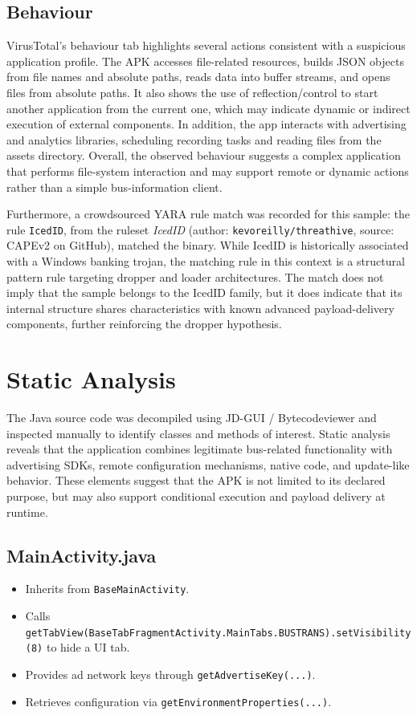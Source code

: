         \subsection{Behaviour}
        VirusTotal's behaviour tab highlights several actions consistent with a suspicious application profile. The APK accesses file-related resources, builds JSON objects from file names and absolute paths, reads data into buffer streams, and opens files from absolute paths. It also shows the use of reflection/control to start another application from the current one, which may indicate dynamic or indirect execution of external components. In addition, the app interacts with advertising and analytics libraries, scheduling recording tasks and reading files from the assets directory. Overall, the observed behaviour suggests a complex application that performs file-system interaction and may support remote or dynamic actions rather than a simple bus-information client.

        Furthermore, a crowdsourced YARA rule match was recorded for this sample: the rule \texttt{IcedID}, from the ruleset \textit{IcedID} (author: \texttt{kevoreilly/threathive}, source: CAPEv2 on GitHub), matched the binary. While IcedID is historically associated with a Windows banking trojan, the matching rule in this context is a structural pattern rule targeting dropper and loader architectures. The match does not imply that the sample belongs to the IcedID family, but it does indicate that its internal structure shares characteristics with known advanced payload-delivery components, further reinforcing the dropper hypothesis.

    \section{Static Analysis}
    The Java source code was decompiled using JD-GUI / Bytecodeviewer and inspected manually to identify classes and methods of interest.
    Static analysis reveals that the application combines legitimate bus-related functionality with advertising SDKs, remote configuration mechanisms, native code, and update-like behavior. These elements suggest that the APK is not limited to its declared purpose, but may also support conditional execution and payload delivery at runtime.

    \subsection{MainActivity.java}
\begin{itemize}
    \item Inherits from \texttt{BaseMainActivity}.
    \item Calls \texttt{getTabView(BaseTabFragmentActivity.MainTabs.BUSTRANS).setVisibility(8)} to hide a UI tab.
    \item Provides ad network keys through \texttt{getAdvertiseKey(...)}.
    \item Retrieves configuration via \texttt{getEnvironmentProperties(...)}.
\end{itemize}

